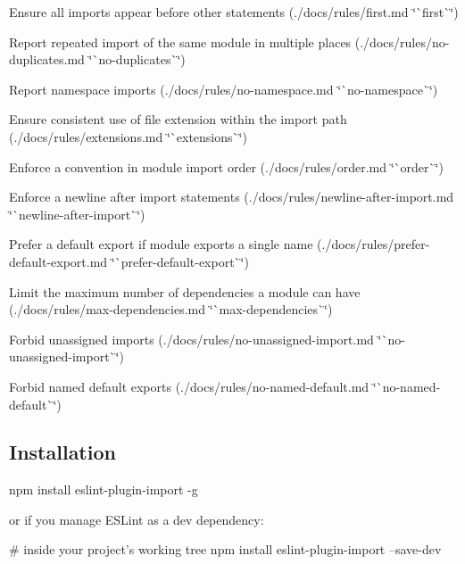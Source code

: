 \begin{DoxyItemize}
\item Ensure all imports appear before other statements (./docs/rules/first.md \char`\"{}\`{}first\`{}\char`\"{})
\item Report repeated import of the same module in multiple places (./docs/rules/no-\/duplicates.md \char`\"{}\`{}no-\/duplicates\`{}\char`\"{})
\item Report namespace imports (./docs/rules/no-\/namespace.md \char`\"{}\`{}no-\/namespace\`{}\char`\"{})
\item Ensure consistent use of file extension within the import path (./docs/rules/extensions.md \char`\"{}\`{}extensions\`{}\char`\"{})
\item Enforce a convention in module import order (./docs/rules/order.md \char`\"{}\`{}order\`{}\char`\"{})
\item Enforce a newline after import statements (./docs/rules/newline-\/after-\/import.md \char`\"{}\`{}newline-\/after-\/import\`{}\char`\"{})
\item Prefer a default export if module exports a single name (./docs/rules/prefer-\/default-\/export.md \char`\"{}\`{}prefer-\/default-\/export\`{}\char`\"{})
\item Limit the maximum number of dependencies a module can have (./docs/rules/max-\/dependencies.md \char`\"{}\`{}max-\/dependencies\`{}\char`\"{})
\item Forbid unassigned imports (./docs/rules/no-\/unassigned-\/import.md \char`\"{}\`{}no-\/unassigned-\/import\`{}\char`\"{})
\item Forbid named default exports (./docs/rules/no-\/named-\/default.md \char`\"{}\`{}no-\/named-\/default\`{}\char`\"{})
\end{DoxyItemize}

\subsection*{Installation}


\begin{DoxyCode}
npm install eslint-plugin-import -g
\end{DoxyCode}


or if you manage E\+S\+Lint as a dev dependency\+:


\begin{DoxyCode}
# inside your project's working tree
npm install eslint-plugin-import --save-dev
\end{DoxyCode}


